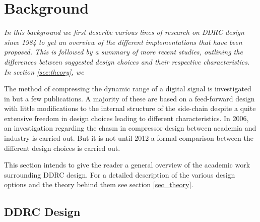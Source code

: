 \documentclass[../main2.tex]{subfiles}
\begin{document}
\section{Background} \label{background}
\emph{In this background we first describe various lines of research on DDRC design since 1984 to get an overview of the different implementations that have been proposed. This is followed by a summary of more recent studies, outlining the differences between suggested design choices and their respective characteristics. In section \ref{sec:theory}, we}

The method of compressing the dynamic range of a digital signal is investigated in but a few publications. A majority of these are based on a feed-forward design with little modifications to the internal structure of the side-chain despite a quite extensive freedom in design choices leading to different characteristics.  In 2006, an investigation regarding the chasm in compressor design between academia and industry is carried out. But it is not until 2012 a formal comparison between the different design choices is carried out.

This section intends to give the reader a general overview of the academic work surrounding DDRC design. For a detailed description of the various design options and the theory behind them see section \ref{sec_theory}.

\FloatBarrier
\subsection{DDRC Design}
\end{document}

